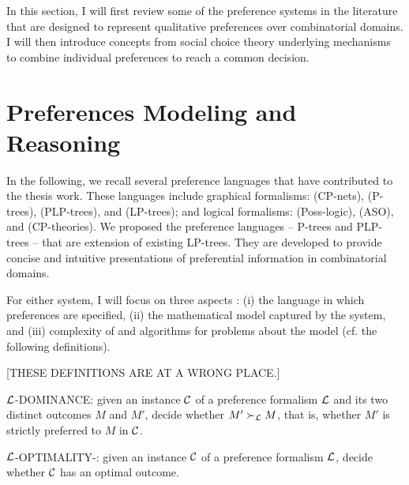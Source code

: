 
In this section, I will first review some of the preference
systems in the literature that are designed to represent
qualitative preferences over combinatorial domains. 
I will then introduce concepts
from social choice theory underlying mechanisms to
combine individual preferences to reach a common decision.

\section{Preferences Modeling and Reasoning \label{sec:pref_reasoning}}
In the following, we recall several preference languages that
have contributed to the thesis work.
These languages include graphical formalisms:
 (CP-nets),
 (P-trees),
 (PLP-trees), and
 (LP-trees);
and logical formalisms:
 (Poss-logic),
 (ASO), and
 (CP-theories).
We proposed the preference languages -- P-trees and PLP-trees --
that are extension of existing LP-trees.
They are developed to provide concise and intuitive
presentations of preferential information in 
combinatorial domains.


For either system, I will focus on three aspects \cite{Domshlak20111037}:
(i) the language in which preferences are specified,
(ii) the mathematical model captured by the system,
and (iii) complexity of and algorithms for
problems about the model (cf. the following definitions).

[THESE DEFINITIONS ARE AT A WRONG PLACE.]
\begin{definition}
\label{def:dom}
  $\mathcal{L}$-DOMINANCE: given an instance $\mathcal{C}$ of a preference
	formalism $\mathcal{L}$ and its two distinct outcomes
  $M$ and $M'$, decide whether $M' \succ_{\mathcal{L}} M$, that is,
  whether $M'$ is strictly preferred to $M$ in $\mathcal{C}$.
\end{definition}

\begin{definition}
\label{def:opt1}
  $\mathcal{L}$-OPTIMALITY-: given an instance $\mathcal{C}$ of a preference
	formalism $\mathcal{L}$,
  decide whether $\mathcal{C}$ has an optimal outcome.
\end{definition}

